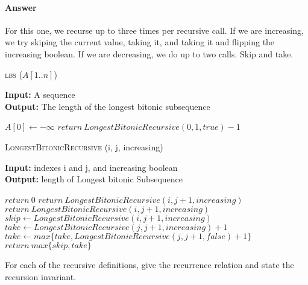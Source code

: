 \documentclass{article}
\begin{document}
\paragraph{Answer}

For this one, we recurse up to three times per recursive call. If we are increasing, we try
skiping the current value, taking it, and taking it and flipping the increasing boolean.
If we are decreasing, we do up to two calls. Skip and take.

\begin{algorithm} \caption{\textsc{lbs} ($A[1..n]$)}\label{alg:seb}
    {\bf Input:} A sequence\\
    {\bf Output:} The length of the longest bitonic subsequence
    \begin{algorithmic}[1]
        \State$A[0] \gets -\infty$
        \State$return\ LongestBitonicRecursive(0, 1, true) -1$
    \end{algorithmic}
\end{algorithm}

\begin{algorithm} \caption{\textsc{LongestBitonicRecursive} (i, j, increasing)}\label{alg:seb}
    {\bf Input:} indexes i and j, and increasing boolean\\
    {\bf Output:} length of Longest bitonic Subsequence
    \begin{algorithmic}[1]
            \State$return\ 0$
                \State$return\ LongestBitonicRecursive(i, j+1, increasing)$
            \EndIf{}
        \Else{}
                \State$return\ LongestBitonicRecursive(i, j+1, increasing)$
            \EndIf{}
        \EndIf{}
        \State$skip \gets LongestBitonicRecursive(i, j+1, increasing)$
        \State$take \gets LongestBitonicRecursive(j, j+1, increasing) +1$
            \State$take \gets max\{take, LongestBitonicRecursive(j, j+1, false) +1\}$
        \EndIf{}
        \State$return\ max\{skip, take\}$
    \end{algorithmic}
\end{algorithm}
\todo{}



For each of the recursive definitions, give the recurrence
relation and state the recursion invariant.
\end{document}
